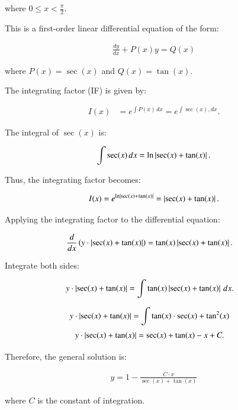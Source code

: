 \documentclass[journal]{IEEEtran}
\begin{document}
where $0 \leq x < \frac{\pi}{2}$.

This is a first-order linear differential equation of the form:

\begin{align}
\frac{dy}{dx} + P(x)y = Q(x)
\end{align}

where $P(x) = \sec(x)$ and $Q(x) = \tan(x)$.

The integrating factor (IF) is given by:

\begin{align}
I(x) &= e^{\int P(x) \, dx} = e^{\int \sec (x), dx}.
\end{align}

The integral of $\sec(x)$ is:

\begin{align}
\int \sec(x) \, dx = \ln \left\vert\sec(x) + \tan(x)\right\vert.
\end{align}

Thus, the integrating factor becomes:

\begin{align}
I(x) = e^{\ln\left\vert\sec(x) + \tan(x)\right\vert} = \left\vert\sec(x) + \tan(x)\right\vert.
\end{align}

Applying the integrating factor to the differential equation:

\begin{align}
\frac{d}{dx}\left( y \cdot \left\vert\sec(x) + \tan(x)\right\vert\right) &= \tan(x) \left\vert\sec(x) + \tan(x)\right\vert.
\end{align}

Integrate both sides:

\begin{align}
y \cdot \left\vert\sec(x) + \tan(x)\right\vert &= \int \tan(x) \left\vert\sec(x) + \tan(x)\right\vert \, dx.
\end{align}

\begin{align}
y \cdot \left\vert\sec(x) + \tan(x)\right\vert &= \int \tan(x) \cdot {\sec(x)} + \tan^{2}(x)
\end{align}
\begin{align}
y \cdot \left\vert\sec(x) + \tan(x)\right\vert &=  \sec(x) +\tan(x) - x + C.
\end{align}

Therefore, the general solution is:

\begin{align}
y = 1 - \frac{C \cdot x}{\sec(x) + \tan(x)}
\end{align}

where $C$ is the constant of integration.
\end{document}
